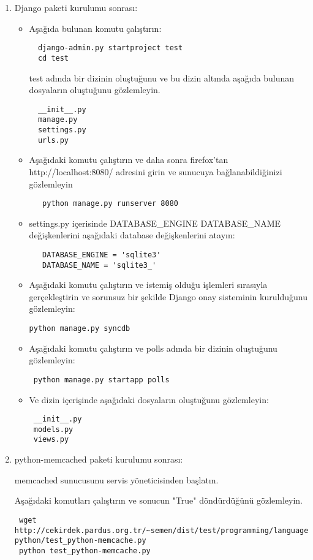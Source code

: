 \documentclass[a4paper,10pt]{article}
\begin{document}
\begin{enumerate}
 \item Django paketi kurulumu sonrası:
\begin{itemize}
 \item Aşağıda bulunan komutu çalıştırın:
 \begin{verbatim}
  django-admin.py startproject test
  cd test
 \end{verbatim}
 test adında bir dizinin oluştuğunu ve bu dizin altında aşağıda bulunan dosyaların oluştuğunu gözlemleyin.
  \begin{verbatim}
  __init__.py
  manage.py
  settings.py
  urls.py 
  \end{verbatim}
 \item Aşağıdaki komutu çalıştırın ve daha sonra firefox'tan http://localhost:8080/ adresini girin ve sunucuya bağlanabildiğinizi gözlemleyin
  \begin{verbatim}
   python manage.py runserver 8080
  \end{verbatim}
 \item settings.py içerisinde DATABASE\_ENGINE DATABASE\_NAME değişkenlerini aşağıdaki database değişkenlerini atayın:
  \begin{verbatim}
   DATABASE_ENGINE = 'sqlite3'
   DATABASE_NAME = 'sqlite3_'   
  \end{verbatim}
\item Aşağıdaki komutu çalıştırın ve istemiş olduğu işlemleri sırasıyla gerçekleştirin ve sorunsuz bir şekilde Django onay sisteminin kurulduğunu gözlemleyin:
\begin{verbatim}
python manage.py syncdb 
\end{verbatim}
\item Aşağıdaki komutu çalıştırın ve polls adında bir dizinin oluştuğunu gözlemleyin:
\begin{verbatim}
 python manage.py startapp polls 
\end{verbatim}
\item Ve dizin içerişinde aşağıdaki dosyaların oluştuğunu gözlemleyin:
\begin{verbatim}
 __init__.py
 models.py
 views.py
\end{verbatim}

\end{itemize}

\item python-memcached paketi kurulumu sonrası:

memcached sunucusunu servis yöneticisinden başlatın.

Aşağıdaki komutları çalıştırın ve sonucun "True" döndürdüğünü gözlemleyin.
\begin{verbatim}
 wget http://cekirdek.pardus.org.tr/~semen/dist/test/programming/language/
python/test_python-memcache.py
 python test_python-memcache.py
\end{verbatim}


\end{enumerate}
\end{document}

